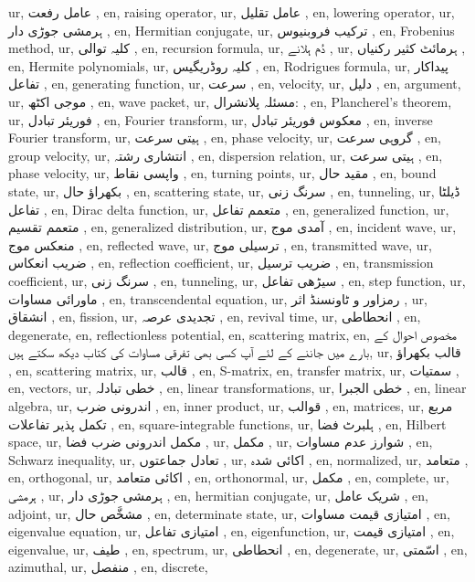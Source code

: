 ur, عامل رفعت ,
en, raising operator,
ur, عامل تقلیل ,
en, lowering operator,
ur, ہرمشی جوڑی دار ,
en, Hermitian conjugate,
ur, ترکیب فروبنیوس ,
en, Frobenius method,
ur, کلیہ توالی ,
en, recursion formula,
ur, دُم ہلانے ,
ur, ہرمائٹ کثیر رکنیاں ,
en, Hermite polynomials,
ur, کلیہ روڈریگیس ,
en, Rodrigues formula,
ur, پیداکار تفاعل ,
en, generating function,
ur, سرعت ,
en, velocity,
ur, دلیل ,
en, argument,
ur, موجی اکٹھ ,
en, wave packet,
ur, مسئلہ پلانشرال: ,
en, Plancherel's theorem,
ur, فوریئر تبادل ,
en, Fourier transform,
ur, معکوس فوریئر تبادل ,
en, inverse Fourier transform,
ur, ہیتی سرعت ,
en, phase velocity,
ur, گروہی سرعت ,
en, group velocity,
ur, انتشاری رشتہ ,
en, dispersion relation,
ur, ہیتی سرعت ,
en, phase velocity,
ur, واپسی نقاط ,
en, turning points,
ur, مقید حال ,
en, bound state,
ur, بکھراؤ حال ,
en, scattering state,
ur, سرنگ زنی ,
en, tunneling,
ur, ڈیلٹا تفاعل ,
en, Dirac delta function,
ur, \footnotesize {متعمم تفاعل} ,
en, generalized function,
ur, \footnotesize {متعمم تقسیم} ,
en, generalized distribution,
ur, آمدی موج ,
en, incident wave,
ur, منعکس موج ,
en, reflected wave,
ur, ترسیلی موج ,
en, transmitted wave,
ur,  ضریب انعکاس ,
en, reflection coefficient,
ur,  ضریب ترسیل ,
en, transmission coefficient,
ur, سرنگ زنی ,
en, tunneling,
ur,  سیڑھی تفاعل ,
en, step function,
ur, ماورائی مساوات ,
en, transcendental equation,
ur, رمزاور و ٹاونسنڈ اثر ,
ur, انشقاق  ,
en, fission,
ur,  تجدیدی عرصہ ,
en, revival time,
ur,  انحطاطی ,
en, degenerate,
en, reflectionless potential,
en, scattering matrix,
en, مخصوص احوال کے بارے میں جاننے کے لئے آپ کسی بھی تفرقی مساوات کی کتاب دیکھ سکتے ہیں,
ur,  قالب بکھراؤ ,
en, scattering matrix,
ur, قالب  ,
en, S-matrix,
en, transfer matrix,
ur, سمتیات ,
en, vectors,
ur, خطی تبادلہ ,
en, linear transformations,
ur, خطی الجبرا ,
en, linear algebra,
ur, اندرونی ضرب ,
en, inner product,
ur, قوالب ,
en, matrices,
ur,  مربع تکمل پذیر تفاعلات ,
en, square-integrable functions,
ur, ہلبرٹ فضا ,
en, Hilbert space,
ur, مکمل اندرونی ضرب فضا ,
ur, مکمل ,
ur, شوارز عدم مساوات ,
en, Schwarz inequality,
ur, تعادل جماعتوں ,
ur,  اکائی شدہ ,
en, normalized,
ur, متعامد ,
en, orthogonal,
ur, اکائی متعامد ,
en, orthonormal,
ur,  مکمل ,
en, complete,
ur, ہرمشی ,
ur,  ہرمشی جوڑی دار ,
en, hermitian conjugate,
ur,  شریک عامل ,
en, adjoint,
ur, مشخَّص حال ,
en, determinate state,
ur,  امتیازی قیمت مساوات ,
en, eigenvalue equation,
ur, امتیازی تفاعل ,
en, eigenfunction,
ur,  امتیازی قیمت ,
en, eigenvalue,
ur,  طیف ,
en, spectrum,
ur, انحطاطی ,
en, degenerate,
ur, اسّمتی ,
en, azimuthal,
ur, منفصل ,
en, discrete,
